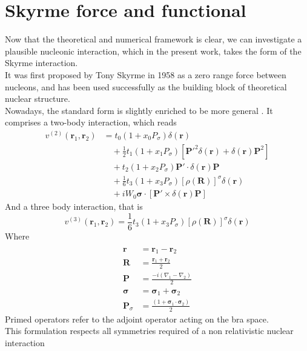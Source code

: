 \section{Skyrme force and functional}
Now that the theoretical and numerical framework is clear, we can investigate a plausible nucleonic interaction, which in the present work, takes the form of the Skyrme interaction.
\\It was first proposed by Tony Skyrme in 1958 \cite{SKYRME1958615} as a zero range force between nucleons, and has been used successfully as the building block of theoretical nuclear structure.
\\Nowadays, the standard form is slightly enriched to be more general \cite{CHABANAT1997710}. It comprises a two-body interaction, which reads
\begin{align}
v^{(2)}(\mathbf{r}_1, \mathbf{r}_2) &= t_0 \left(1 + x_0 P_\sigma \right) \delta(\mathbf{r}) \\
&\quad + \frac{1}{2} t_1 \left(1 + x_1 P_\sigma \right) \left[ \mathbf{P}'^2 \delta(\mathbf{r}) + \delta(\mathbf{r}) \mathbf{P}^2 \right] \\
&\quad + t_2 \left(1 + x_2 P_\sigma \right) \mathbf{P}' \cdot \delta(\mathbf{r}) \mathbf{P} \\
&\quad + \frac{1}{6} t_3 \left(1 + x_3 P_\sigma \right) \left[ \rho(\mathbf{R}) \right]^\sigma \delta(\mathbf{r}) \\
&\quad + i W_0 \boldsymbol{\sigma}\cdot \left[ \mathbf{P}' \times \delta(\mathbf{r}) \mathbf{P} \right]
\end{align}
And a three body interaction, that is
\begin{equation}
v^{(3)}(\mathbf r_1, \mathbf r_2)=\frac 1 6 t_3 \left(1 + x_3 P_\sigma \right) \left[ \rho(\mathbf{R}) \right]^\sigma \delta(\mathbf{r}) 
\end{equation}
Where 
\begin{align*}
\\\mathbf{r} &= \mathbf{r}_1 - \mathbf{r}_2
\\\mathbf{R} &= \frac{\mathbf{r}_1+\mathbf{r}_2}{2}
\\\mathbf{P} &= \frac{-i(\nabla_1 - \nabla_2)}{2}
\\\boldsymbol{\sigma} &= \boldsymbol{\sigma}_1 + \boldsymbol{\sigma}_2
\\\mathbf{P}_\sigma &= \frac{(1+\boldsymbol{\sigma}_1\cdot\boldsymbol{\sigma}_2)}{2}
\end{align*}
Primed operators refer to the adjoint operator acting on the bra space.
\\This formulation respects all symmetries required of a non relativistic nuclear interaction 
